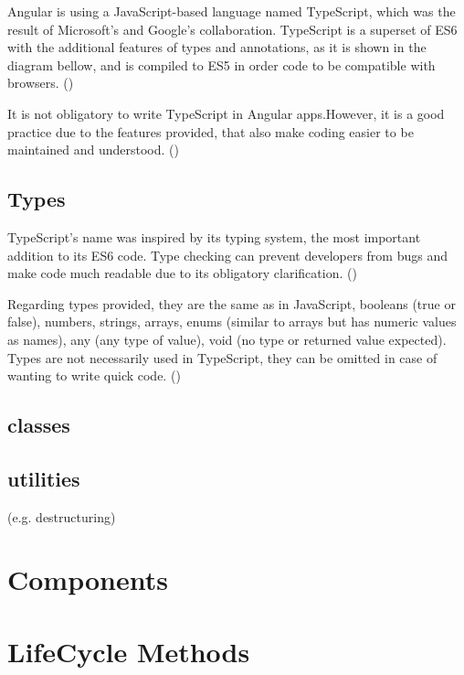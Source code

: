 Angular is using a JavaScript-based language named TypeScript, which was the result of Microsoft's and Google's collaboration. TypeScript is a superset of ES6 with the additional features of types and annotations, as it is shown in the diagram bellow, and is compiled to ES5 in order code to be compatible with browsers. (\cite{murray2018ng}) \par

It is not obligatory to write TypeScript in Angular apps.However, it is a good practice due to the features provided, that also make coding easier to be maintained and understood. (\cite{angularUpandRunning}) \par

\subsection{Types}

TypeScript's name was inspired by its typing system, the most important addition to its ES6 code. Type checking can prevent developers from bugs and make code much readable due to its obligatory clarification. (\cite{murray2018ng}) \par 

Regarding types provided, they are the same as in JavaScript, booleans (true or false), numbers, strings, arrays, enums (similar to arrays but has numeric values as names), any (any type of value), void (no type or returned value expected). Types are not necessarily used in TypeScript, they can be omitted in case of wanting to write quick code. (\cite{murray2018ng}) \par

\subsection{classes} 


\subsection{utilities}  (e.g. destructuring)


\section{Components} %


\section{LifeCycle Methods}


